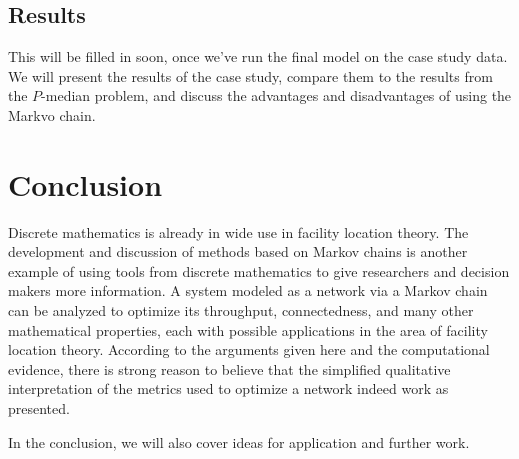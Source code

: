 \documentclass[twoside,twocolumn]{article}
\begin{document}

\subsection{Results}

This will be filled in soon, once we've run the final model on the case study data.
We will present the results of the case study, compare them to the results from the $P$-median problem, and discuss the advantages and disadvantages of using the Markvo chain.









\section{Conclusion}

Discrete mathematics is already in wide use in facility location theory. %
The development and discussion of methods based on Markov chains is another example of using tools from discrete mathematics to give researchers and decision makers more information.
A system modeled as a network via a Markov chain can be analyzed to optimize its throughput, connectedness, and many other mathematical properties, each with possible applications in the area of facility location theory.
According to the arguments given here and the computational evidence, there is strong reason to believe that the simplified qualitative interpretation of the metrics used to optimize a network indeed work as presented.

In the conclusion, we will also cover ideas for application and further work.

\end{document}
